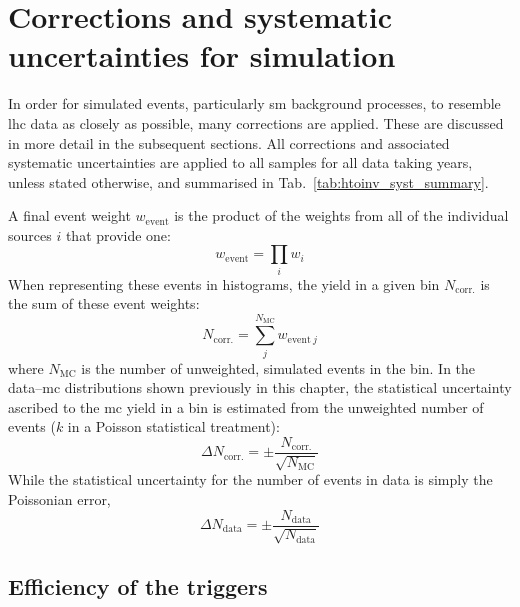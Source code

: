 \section{Corrections and systematic uncertainties for simulation}
\label{sec:htoinv_mc_corrections}

In order for simulated events, particularly \acrshort{sm} background processes, to resemble \acrshort{lhc} data as closely as possible, many corrections are applied. These are discussed in more detail in the subsequent sections. All corrections and associated systematic uncertainties are applied to all samples for all data taking years, unless stated otherwise, and summarised in Tab.~\ref{tab:htoinv_syst_summary}.

A final event weight $w_{\mathrm{event}}$ is the product of the weights from all of the individual sources $i$ that provide one:
\begin{equation}
    w_{\mathrm{event}} = \prod_i w_i
    \label{eq:event_weight}
\end{equation}
When representing these events in histograms, the yield in a given bin $N_{\mathrm{corr.}}$ is the sum of these event weights:
\begin{equation}
    N_{\mathrm{corr.}} = \sum_j^{N_{\mathrm{MC}}} w_{\mathrm{event} \ j}
    \label{eq:bin_weight}
\end{equation}
where $N_{\mathrm{MC}}$ is the number of unweighted, simulated events in the bin. In the data--\acrshort{mc} distributions shown previously in this chapter, the statistical uncertainty ascribed to the \acrshort{mc} yield in a bin is estimated from the unweighted number of events ($k$ in a Poisson statistical treatment):
\begin{equation}
    \Delta N_{\mathrm{corr.}} = \pm \frac{ N_{\mathrm{corr.}} }{ \sqrt{N_{\mathrm{MC}}} }
    \label{eq:uncertainty_mc_ours}
\end{equation}
While the statistical uncertainty for the number of events in data is simply the Poissonian error,
\begin{equation}
    \Delta N_{\mathrm{data}} = \pm \frac{ N_{\mathrm{data}} }{ \sqrt{N_{\mathrm{data}}} }
    \label{eq:uncertainty_data}
\end{equation}




\subsection{Efficiency of the triggers}
\label{subsec:htoinv_trigger_effs}

